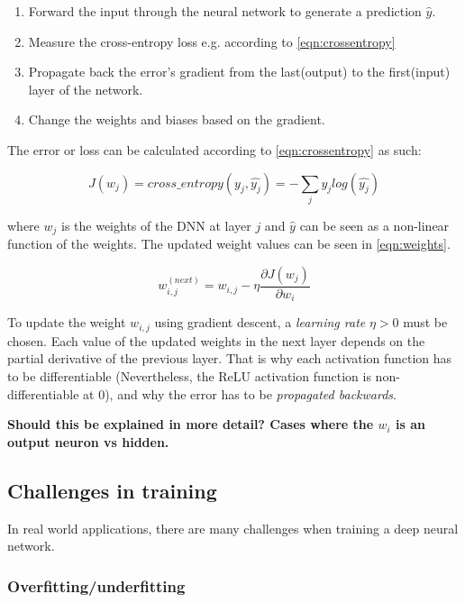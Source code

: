 \documentclass[english, bibtex]{kththesis}
\begin{document}
\begin{enumerate}
\item Forward the input through the neural network to generate a prediction $\hat{y}$.
\item Measure the cross-entropy loss e.g. according to \autoref{eqn:crossentropy} 
\item Propagate back the error’s gradient from the last(output) to the first(input) layer of the network.
\item Change the weights and biases based on the gradient.
\end{enumerate}

The error or loss can be calculated according to \autoref{eqn:crossentropy} as such: 

\begin{equation}
    J(w_j) = cross\_entropy(y_j,\hat{y_j}) = - \sum_{j} y_j log(\hat{y_j})
    \label{eqn:jacobian}
\end{equation}


where $w_j$ is the weights of the DNN at layer $j$ and $\hat{y}$ can be seen as a non-linear function of the weights. The updated weight values can be seen in \autoref{eqn:weights}. 

\begin{equation}
    w_{i,j}^{(next)} = w_{i,j} - \eta \frac{\partial J(w_j)}{\partial w_i}
    \label{eqn:weights}
\end{equation}

To update the weight $w_{i,j}$ using gradient descent, a \textit{learning rate} $\eta > 0$ must be chosen. Each value of the updated weights in the next layer depends on the partial derivative of the previous layer. That is why each activation function has to be differentiable (Nevertheless, the ReLU activation function is non-differentiable at 0), and why the error has to be \textit{propagated backwards}. 

\textbf{Should this be explained in more detail? Cases where the $w_i$ is an output neuron vs hidden. }

\subsection{Challenges in training}

In real world applications, there are many challenges when training a deep neural network.

\subsubsection{Overfitting/underfitting}
\end{document}
